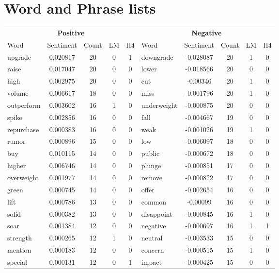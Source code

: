 \documentclass[ oneside,tikz,%
                    author={Joshua Felmeden},
                    degree={MEng},
                     title={Semantic Analysis of Financial Headlines Based on Realised Stock Returns},
                  subtitle={Research}]{dissertation}
\begin{document}
\chapter{Word and Phrase lists}
\begin{table}
      
\begin{tabular}{lcccclcccc}
\multicolumn{5}{c}{\textbf{Positive}} & \multicolumn{5}{c}{\textbf{Negative}} \\
\cmidrule(lr){1-5}
\cmidrule(lr){6-10}
Word & Sentiment & Count & LM & H4 & Word & Sentiment & Count & LM & H4 \\
\cmidrule(lr){1-5}
\cmidrule(lr){6-10}
upgrade & 0.020817 & 20 & 0 & 1 & downgrade & -0.028087 & 20 & 1 & 0 \\
raise & 0.017047 & 20 & 0 & 0 & lower & -0.018566 & 20 & 0 & 0 \\
high & 0.002975 & 20 & 0 & 0 & cut & -0.00346 & 20 & 1 & 0 \\
volume & 0.006617 & 18 & 0 & 0 & miss & -0.001796 & 20 & 1 & 0 \\
outperform & 0.003602 & 16 & 1 & 0 & underweight & -0.000875 & 20 & 0 & 0 \\
spike & 0.002856 & 16 & 0 & 0 & fall & -0.004667 & 19 & 0 & 0 \\
repurchase & 0.000383 & 16 & 0 & 0 & weak & -0.001026 & 19 & 1 & 0 \\
rumor & 0.000896 & 15 & 0 & 0 & low & -0.006097 & 18 & 0 & 0 \\
buy & 0.010115 & 14 & 0 & 0 & public & -0.000672 & 18 & 0 & 0 \\
higher & 0.006746 & 14 & 0 & 0 & plunge & -0.000851 & 17 & 0 & 0 \\
overweight & 0.001977 & 14 & 0 & 0 & remove & -0.000822 & 17 & 0 & 0 \\
green & 0.000745 & 14 & 0 & 0 & offer & -0.002654 & 16 & 0 & 0 \\
lift & 0.000786 & 13 & 0 & 0 & common & -0.00099 & 16 & 0 & 0 \\
solid & 0.000382 & 13 & 0 & 0 & disappoint & -0.000845 & 16 & 1 & 0 \\
soar & 0.001384 & 12 & 0 & 0 & negative & -0.000697 & 16 & 1 & 1 \\
strength & 0.000265 & 12 & 1 & 0 & neutral & -0.003533 & 15 & 0 & 0 \\
mention & 0.000183 & 12 & 0 & 0 & concern & -0.000515 & 15 & 1 & 0 \\
special & 0.000131 & 12 & 0 & 1 & impact & -0.000425 & 15 & 0 & 0 \\

\end{tabular}
\end{table}
\end{document}

